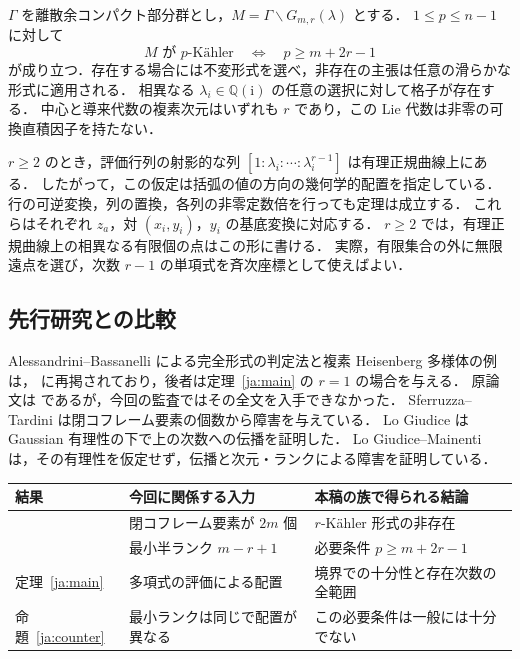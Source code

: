 \documentclass[12pt]{amsart}
\theoremstyle{definition}
\theoremstyle{remark}
\numberwithin{equation}{section}
\newcommand{\Q}{\mathbb{Q}}
\newcommand{\ii}{\mathrm i}
\begin{document}
\begin{jthm}\label{ja:main}
$\Gamma$ を離散余コンパクト部分群とし，$M=\Gamma\backslash G_{m,r}(\lambda)$ とする．
$1\leq p\leq n-1$ に対して
\begin{equation}\label{ja:threshold}
 M\text{ が }p\text{-K\"ahler}
 \quad\Longleftrightarrow\quad p\geq m+2r-1
\end{equation}
が成り立つ．存在する場合には不変形式を選べ，非存在の主張は任意の滑らかな形式に適用される．
相異なる $\lambda_i\in\Q(\ii)$ の任意の選択に対して格子が存在する．
中心と導来代数の複素次元はいずれも $r$ であり，この Lie 代数は非零の可換直積因子を持たない．
\end{jthm}

$r\geq2$ のとき，評価行列の射影的な列
$[1:\lambda_i:\cdots:\lambda_i^{r-1}]$ は有理正規曲線上にある．
したがって，この仮定は括弧の値の方向の幾何学的配置を指定している．
行の可逆変換，列の置換，各列の非零定数倍を行っても定理は成立する．
これらはそれぞれ $z_a$，対 $(x_i,y_i)$，$y_i$ の基底変換に対応する．
$r\geq2$ では，有理正規曲線上の相異なる有限個の点はこの形に書ける．
実際，有限集合の外に無限遠点を選び，次数 $r-1$ の単項式を斉次座標として使えばよい．

\subsection{先行研究との比較}
Alessandrini--Bassanelli による完全形式の判定法と複素 Heisenberg 多様体の例は，
\cite[Proposition 2.15, Example 2.16]{ja:LM} に再掲されており，後者は定理~\ref{ja:main} の $r=1$ の場合を与える．
原論文は \cite{ja:AB} であるが，今回の監査ではその全文を入手できなかった．
Sferruzza--Tardini \cite[Theorem 2.3]{ja:ST} は閉コフレーム要素の個数から障害を与えている．
Lo Giudice \cite[Theorem 4.1]{ja:LG} は Gaussian 有理性の下で上の次数への伝播を証明した．
Lo Giudice--Mainenti \cite[Theorems 5.4--5.5, Lemma 5.7]{ja:LM} は，その有理性を仮定せず，伝播と次元・ランクによる障害を証明している．

\begin{center}\small
\begin{tabularx}{\textwidth}{@{}>{\raggedright\arraybackslash}p{3.3cm}>{\raggedright\arraybackslash}X>{\raggedright\arraybackslash}X@{}}
\toprule
結果 & 今回に関係する入力 & 本稿の族で得られる結論 \\
\midrule
\cite[Th.~2.3]{ja:ST} & 閉コフレーム要素が $2m$ 個 & $r$-K\"ahler 形式の非存在 \\
\cite[Lem.~5.7]{ja:LM} & 最小半ランク $m-r+1$ & 必要条件 $p\geq m+2r-1$ \\
定理~\ref{ja:main} & 多項式の評価による配置 & 境界での十分性と存在次数の全範囲 \\
命題~\ref{ja:counter} & 最小ランクは同じで配置が異なる & この必要条件は一般には十分でない \\
\bottomrule
\end{tabularx}
\end{center}
\end{document}
